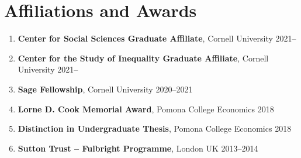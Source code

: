 \documentclass[letterpaper,11pt,oneside]{article}
\begin{document}
\section*{Affiliations and Awards}
\begin{enumerate}[itemsep=2pt, label={}]
    \item \textbf{Center for Social Sciences Graduate Affiliate}, Cornell University 2021--
    \item \textbf{Center for the Study of Inequality Graduate Affiliate}, Cornell University 2021--
    \item \textbf{Sage Fellowship}, Cornell University 2020--2021
    \item \textbf{Lorne D. Cook Memorial Award}, Pomona College Economics 2018
    \item \textbf{Distinction in Undergraduate Thesis}, Pomona College Economics 2018
    \item \textbf{Sutton Trust -- Fulbright Programme}, London UK 2013--2014  
\end{enumerate}
\end{document}
